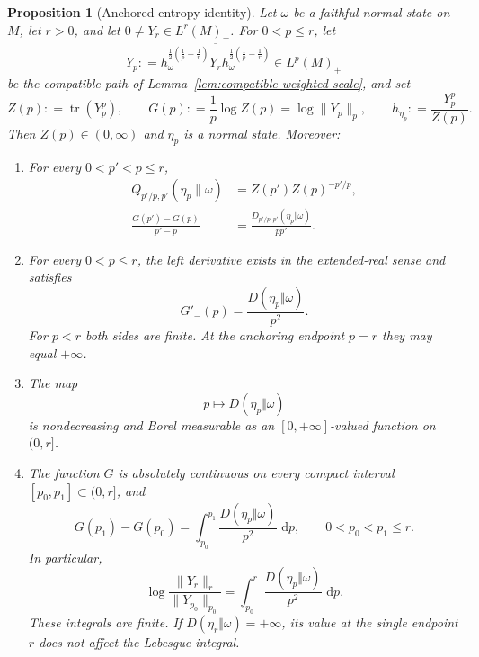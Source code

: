 \documentclass[12pt]{article}
\numberwithin{equation}{section}
\newtheorem{proposition}[theorem]{Proposition}
\theoremstyle{definition}
\theoremstyle{remark}
\newcommand{\dd}{\,\mathrm d}
\newcommand{\?}{\overset{?}{=}}
\newcommand{\defeq}{\mathrel{\mathop:}=}
\DeclareMathOperator{\tr}{tr}
\begin{document}
\begin{proposition}[Anchored entropy identity]
\label{prop:anchored-entropy-identity}
Let $\omega$ be a faithful normal state on $M$, let $r>0$, and let
$0\ne Y_r\in L^r(M)_+$.  For $0<p\leq r$, let
\begin{equation}
  Y_p
  \defeq
  \overline{
    h_\omega^{\frac12(\frac1p-\frac1r)}
    Y_r
    h_\omega^{\frac12(\frac1p-\frac1r)}}
  \in L^p(M)_+
  \label{eq:anchored-entropy-path}
\end{equation}
be the compatible path of
Lemma~\ref{lem:compatible-weighted-scale}, and set
\begin{equation}
  Z(p)\defeq\tr(Y_p^p),
  \qquad
  G(p)\defeq\frac1p\log Z(p)=\log\|Y_p\|_p,
  \qquad
  h_{\eta_p}\defeq\frac{Y_p^p}{Z(p)}.
  \label{eq:anchored-entropy-data}
\end{equation}
Then $Z(p)\in(0,\infty)$ and $\eta_p$ is a normal state.  Moreover:
\begin{enumerate}[label=\textup{(\roman*)}]
\item For every $0<p'<p\leq r$,
\begin{align}
  Q_{p'/p,p'}(\eta_p\|\omega)
  &=Z(p')Z(p)^{-p'/p},
  \label{eq:anchored-exact-quotient}\\
  \frac{G(p')-G(p)}{p'-p}
  &=\frac{D_{p'/p,p'}(\eta_p\Vert\omega)}{pp'}.
  \label{eq:anchored-exact-difference-quotient}
\end{align}

\item For every $0<p\leq r$, the left derivative exists in the
extended-real sense and satisfies
\begin{equation}
  G'_-(p)
  =\frac{D(\eta_p\Vert\omega)}{p^2}.
  \label{eq:anchored-entropy-left-derivative}
\end{equation}
For $p<r$ both sides are finite.  At the anchoring endpoint $p=r$
they may equal $+\infty$.

\item The map
\begin{equation}
  p\longmapsto D(\eta_p\Vert\omega)
  \label{eq:anchored-entropy-profile}
\end{equation}
is nondecreasing and Borel measurable as an
$[0,+\infty]$-valued function on $(0,r]$.

\item The function $G$ is absolutely continuous on every compact interval
$[p_0,p_1]\subset(0,r]$, and
\begin{equation}
  G(p_1)-G(p_0)
  =
  \int_{p_0}^{p_1}
  \frac{D(\eta_p\Vert\omega)}{p^2}\,\dd p,
  \qquad 0<p_0<p_1\leq r.
  \label{eq:anchored-entropy-integral}
\end{equation}
In particular,
\begin{equation}
  \log\frac{\|Y_r\|_r}{\|Y_{p_0}\|_{p_0}}
  =
  \int_{p_0}^{r}
  \frac{D(\eta_p\Vert\omega)}{p^2}\,\dd p.
  \label{eq:anchored-entropy-integral-to-anchor}
\end{equation}
These integrals are finite.  If
$D(\eta_r\Vert\omega)=+\infty$, its value at the single endpoint $r$
does not affect the Lebesgue integral.
\end{enumerate}
\end{proposition}
\end{document}
